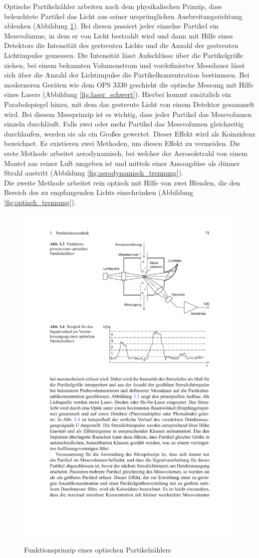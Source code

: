 \newpage
Optische Partikelz\"{a}hler arbeiten nach dem physikalischen Prinzip, dass beleuchtete Partikel das Licht aus seiner urspr\"{u}nglichen Ausbreitungsrichtung ablenken (Abbildung \ref{fig:optischer_messer}). Bei diesen passiert jeder einzelne Partikel ein Messvolumne, in dem er von Licht bestrahlt wird und dann mit Hilfe eines Detektors die Intensit\"{a}t des gestreuten Lichts und die Anzahl der gestreuten Lichtimpulse gemessen. Die Intensit\"{a}t l\"{a}sst Aufschl\"{u}sse \"{u}ber die Partikelgr\"{o}{\ss}e ziehen, bei einem bekannten Volumenstrom und vordefinierter Messdauer l\"{a}sst sich \"{u}ber die Anzahl der Lichtimpulse die Partikelkonzentration bestimmen. Bei moderneren Ger\"{a}ten wie dem OPS 3330 geschieht die optische Messung mit Hilfe eines Lasers (Abbildung \ref{fig:laser_schwert}). Hierbei kommt zus\"{a}tzlich ein Parabolspiegel hinzu, mit dem das gestreute Licht von einem Detektor gesammelt wird. Bei diesem Messprinzip ist es wichtig, dass jeder Partikel das Messvolumen einzeln durchl\"{a}uft. Falls zwei oder mehr Partikel das Messvolumen gleichzeitig durchlaufen, werden sie als ein Gro{\ss}es gewertet. Dieser Effekt wird als Koinzidenz bezeichnet. Es existieren zwei Methoden, um diesen Effekt zu vermeiden. Die erste Methode arbeitet aerodynamisch, bei welcher der Aerosolstrahl von einem Mantel aus reiner Luft umgeben ist und mittels einer Ansaugd\"{u}se als d\"{u}nner Strahl austritt (Abbildung \ref{fig:aerodynamisch_trennung}).\\
Die zweite Methode arbeitet rein optisch mit Hilfe von zwei Blenden, die den Bereich des zu empfangenden Lichts einschr\"{a}nken (Abbildung \ref{fig:optisch_trennung}).

\begin{figure}[H]
	\myfloatalign
	{\includegraphics[width=.5\linewidth]{gfx/measuring_dev/optischer_messer.pdf}} \quad
	\caption[Funktionsprinzip eines optischen Partikelz\"{a}hlers (Quelle: \cite{reinraum}, S.75)]
	{Funktionsprinzip eines optischen Partikelz\"{a}hlers\cite{reinraum}}
	\label{fig:optischer_messer}
\end{figure}

